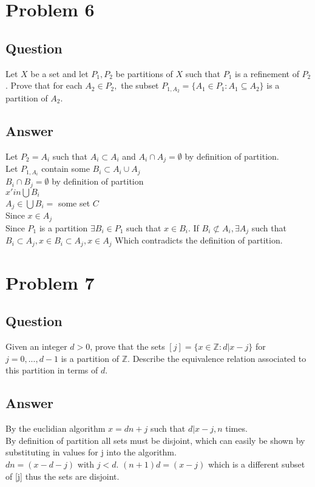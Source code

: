 \documentclass{article}
\begin{document}
\section*{Problem 6}
\subsection*{Question}
Let \(X\) be a set and let \(P_{1}, P_{2}\) be partitions of \(X\) such that \(P_{1}\) is a refinement of \(P_{2}\). Prove that for each \(A_{2} \in P_{2},\) the subset \(P_{1,A_{2}} = \{A_{1} \in P_{1} : A_{1} \subseteq A_{2}\}\) is a partition of \(A_{2}\).
\subsection*{Answer}
Let \(P_{2} = {A_{i}}\) such that \(A_{i} \subset A_{i}\) and \(A_{i} \cap A_{j} = \emptyset\) by definition of partition. \\
Let \(P_{1,A_{i}}\) contain some \(B_{i} \subset A_{i} \cup A_{j}\) \\ \(B_{i} \cap B_{j} = \emptyset\) by definition of partition \\ \(x 'in \bigcup B_{i}\) \\ \(A_{j} \in \bigcup B_{i} =\) some set \(C\) \\ Since \(x \in A_{j}\)\\ Since \(P_{1}\) is a partition \(\exists B_{i} \in P_{1}\) such that \(x \in B_{i}\). If \(B_{i} \not\subset A_{i}, \exists A_{j}\) such that \(B_{i} \subset A_{j}, x \in B_{i} \subset A_{j}, x \in A_{j}\) Which contradicts the definition of partition. 
\section*{Problem 7}
\subsection*{Question}
Given an integer \(d > 0\), prove that the sets \([j] = \{x \in \mathbb{Z} : d | x - j\}\) for \(j = 0, ..., d-1\) is a partition of \(\mathbb{Z}\). Describe the equivalence relation associated to this partition in terms of \(d\).
\subsection*{Answer}
By the euclidian algorithm \(x = dn + j\) such that \(d | x - j, n\) times. \\ By definition of partition all sets must be disjoint, which can easily be shown by substituting in values for j into the algorithm. \\ \(dn = (x - d-j)\) with \(j < d\). \((n+1)d = (x - j)\) which is a different subset of [j] thus the sets are disjoint. 
\end{document}
